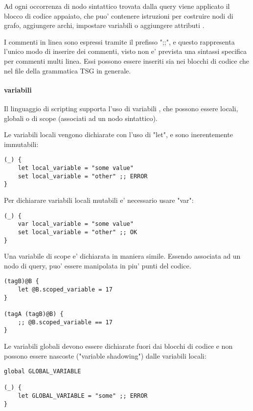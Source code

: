 Ad ogni occorrenza di nodo sintattico trovata dalla query viene applicato il blocco di codice appaiato, che puo' contenere istruzioni per costruire nodi di grafo, aggiungere archi, impostare variabili o aggiungere attributi \cite{TreeSitterGraphReferenceTerminology}.

I commenti in linea sono espressi tramite il prefisso ";;", e questo rappresenta l'unico modo di inserire dei commenti, visto non e' prevista una sintassi specifica per commenti multi linea.
Essi possono essere inseriti sia nei blocchi di codice che nel file della grammatica TSG in generale.

\paragraph{variabili}
Il linguaggio di scripting supporta l'uso di variabili \cite{TreeSitterGraphReferenceVariables}, che possono essere locali, globali o di scope (associati ad un nodo sintattico).

Le variabili locali vengono dichiarate con l'uso di "let", e sono inerentemente immutabili:

\begin{Verbatim}[samepage=true]
(_) {
    let local_variable = "some value"
    set local_variable = "other" ;; ERROR
}
\end{Verbatim}

Per dichiarare variabili locali mutabili e' necessario usare "var":

\begin{Verbatim}[samepage=true]
(_) {
    var local_variable = "some value"
    set local_variable = "other" ;; OK
}
\end{Verbatim}

Una variabile di scope e' dichiarata in maniera simile. Essendo associata ad un nodo di query, puo' essere manipolata in piu' punti del codice.

\begin{Verbatim}[samepage=true]
(tagB)@B {
    let @B.scoped_variable = 17
}

(tagA (tagB)@B) {
    ;; @B.scoped_variable == 17
}
\end{Verbatim}

Le variabili globali devono essere dichiarate fuori dai blocchi di codice e non possono essere nascoste ("variable shadowing") dalle variabili locali:

\begin{Verbatim}[samepage=true]
global GLOBAL_VARIABLE

(_) {
    let GLOBAL_VARIABLE = "some" ;; ERROR
}
\end{Verbatim}

